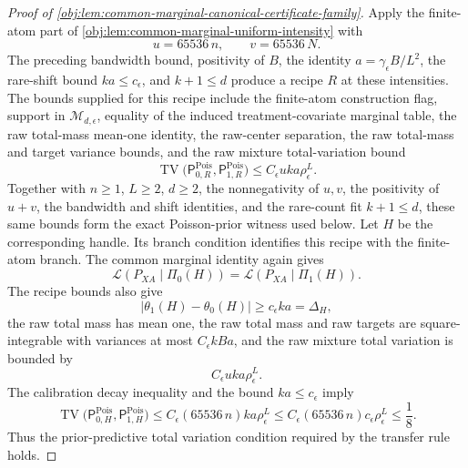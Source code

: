 \documentclass[11pt]{article}
\begin{document}
\begin{proof}[Proof of \cref{obj:lem:common-marginal-canonical-certificate-family}]
Apply the finite-atom part of \cref{obj:lem:common-marginal-uniform-intensity} with
\[
u=65536\,n,\qquad v=65536\,N.
\]
The preceding bandwidth bound, positivity of \(B\), the identity \(a=\gamma_\epsilon B/L^2\), the rare-shift bound \(ka\le c_\epsilon\), and \(k+1\le d\) produce a recipe \(R\) at these intensities.  The bounds supplied for this recipe include the finite-atom construction flag, support in \(\mathcal M_{d,\epsilon}\), equality of the induced treatment-covariate marginal table, the raw total-mass mean-one identity, the raw-center separation, the raw total-mass and target variance bounds, and the raw mixture total-variation bound
\[
\operatorname{TV}
\bigl(\mathsf P_{0,R}^{\mathrm{Pois}},\mathsf P_{1,R}^{\mathrm{Pois}}\bigr)
\le
C_\epsilon u k a \rho_\epsilon^L.
\]
Together with \(n\ge1\), \(L\ge2\), \(d\ge2\), the nonnegativity of \(u,v\), the positivity of \(u+v\), the bandwidth and shift identities, and the rare-count fit \(k+1\le d\), these same bounds form the exact Poisson-prior witness used below.  Let \(H\) be the corresponding handle.  Its branch condition identifies this recipe with the finite-atom branch.  The common marginal identity again gives
\[
\mathcal L(P_{XA}\mid \Pi_0(H))
=
\mathcal L(P_{XA}\mid \Pi_1(H)).
\]
The recipe bounds also give
\[
\left|\theta_1(H)-\theta_0(H)\right|
\ge
c_\epsilon ka
=
\Delta_H,
\]
the raw total mass has mean one, the raw total mass and raw targets are square-integrable with variances at most \(C_\epsilon kBa\), and the raw mixture total variation is bounded by
\[
C_\epsilon u k a\rho_\epsilon^L.
\]
The calibration decay inequality and the bound \(ka\le c_\epsilon\) imply
\[
\operatorname{TV}
\bigl(\mathsf P_{0,H}^{\mathrm{Pois}},\mathsf P_{1,H}^{\mathrm{Pois}}\bigr)
\le
C_\epsilon(65536\,n)ka\rho_\epsilon^L
\le
C_\epsilon(65536\,n)c_\epsilon\rho_\epsilon^L
\le
\frac18 .
\]
Thus the prior-predictive total variation condition required by the transfer rule holds. %


\end{proof}
\end{document}
